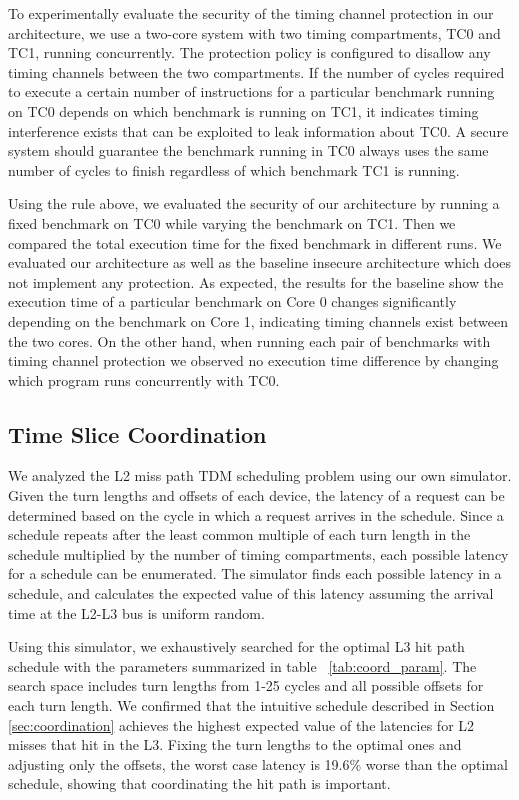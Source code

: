 To experimentally evaluate the security of the timing channel protection in our 
architecture, we use a two-core system with two timing compartments, TC0 and
TC1, running concurrently. The protection policy is configured to disallow any 
timing channels between the two compartments. If the number of cycles required 
to execute a certain number of instructions for a particular benchmark running on 
TC0 depends on which benchmark is running on TC1, it indicates timing 
interference exists that can be exploited to leak information about TC0. A 
secure system should guarantee the benchmark running in TC0 always uses the 
same number of cycles to finish regardless of which benchmark TC1 is running. 

Using the rule above, we evaluated the security of our architecture by running 
a fixed benchmark on TC0 while varying the benchmark on TC1. Then we compared 
the total execution time for the fixed benchmark in different runs. We 
evaluated our architecture as well as the baseline insecure architecture which 
does not implement any protection. As expected, the results for the baseline 
show the execution time of a particular benchmark on Core 0 changes significantly 
depending on the benchmark on Core 1, indicating timing channels exist between
the two cores. On the other hand, when running each pair of benchmarks with 
timing channel protection we observed no execution time difference by changing 
which program runs concurrently with TC0.

\subsection{Time Slice Coordination}
\label{sec:eval_coord}
We analyzed the L2 miss path TDM scheduling problem using our own simulator.
Given the turn lengths and offsets of each device, the latency of a request can be 
determined based on the cycle in which a request arrives in the schedule.
Since a schedule repeats after the least common multiple of each 
turn length in the schedule multiplied by the number of timing compartments, 
each possible latency for a schedule can be enumerated. The simulator finds
each possible latency in a schedule, and calculates the 
expected value of this latency assuming the arrival time at the L2-L3 bus is 
uniform random.

Using this simulator, we exhaustively searched for the optimal L3 hit path 
schedule with the parameters summarized in table ~\ref{tab:coord_param}. The 
search space includes turn lengths from 1-25 cycles and all possible offsets 
for each turn length. We confirmed that the intuitive schedule described in 
Section \ref{sec:coordination} achieves the highest expected value of the 
latencies for L2 misses that hit in the L3.
Fixing the turn lengths to the optimal ones and adjusting only the offsets,
the worst case latency is 19.6\% worse than the optimal schedule, showing
that coordinating the hit path is important.

